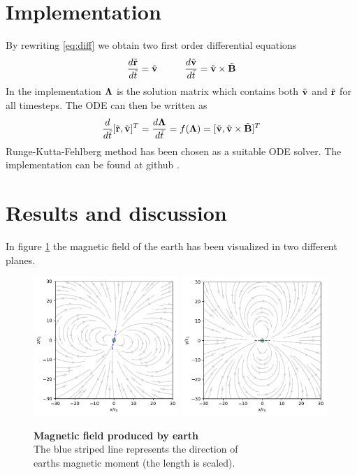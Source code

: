 \documentclass[11pt]{article}
\begin{document}
\section{Implementation}
By rewriting \eqref{eq:diff} we obtain two first order differential equations
\begin{equation}
    \frac{d\tilde{\vectorbold{r}}}{d\tilde{t}} = \tilde{\vectorbold{v}}\\
    \hspace{10mm} \frac{d\tilde{\vectorbold{v}}}{d\tilde{t}} = \tilde{\vectorbold{v}} \times \tilde{\vectorbold{B}} 
\end{equation}
In the implementation $\vectorbold{\Lambda}$ is the solution matrix which contains both $\tilde{\vectorbold{v}}$ and $\tilde{\vectorbold{r}}$ for all timesteps. The ODE can then be written as $$\frac{d}{d\tilde{t}} [\tilde{\vectorbold{r}}, \tilde{\vectorbold{v}}]^T = \frac{d\vectorbold{\Lambda}}{d\tilde{t}} = f(\vectorbold{\Lambda}) = [\tilde{\vectorbold{v}}, \tilde{\vectorbold{v}} \times \tilde{\vectorbold{B}}]^{T}$$
Runge-Kutta-Fehlberg method has been chosen as a suitable ODE solver. The implementation can be found at github \cite{erlensy_github}.

\section{Results and discussion}
In figure \ref{fig:mag_field} the magnetic field of the earth has been visualized in two different planes.
\begin{figure}[!htp]
    \centering
    \captionsetup{justification=centering}
    \includegraphics[width=0.49\textwidth]{../figures/report/magFieldXZ}
    \includegraphics[width=0.49\textwidth]{../figures/report/magFieldXY}
    \caption{\textbf{Magnetic field produced by earth}\\The blue striped line represents the direction of \\earths magnetic moment (the length is scaled).}
    \label{fig:mag_field}
\end{figure}
\end{document}
